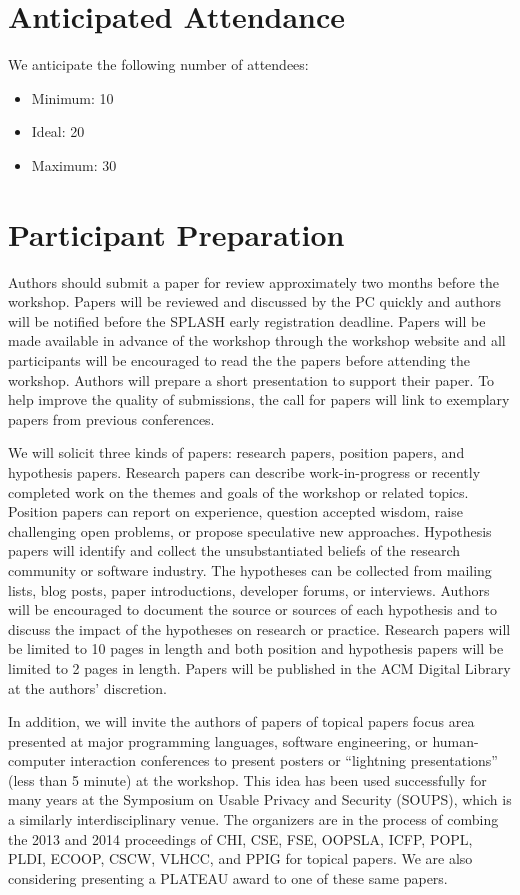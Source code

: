 \documentclass{sigplanconf}
\begin{document}
\section{Anticipated Attendance}

We anticipate the following number of attendees:

\begin{itemize}
\item Minimum: 10 
\item Ideal: 20
\item Maximum: 30 
\end{itemize}

\section{Participant Preparation}\label{preparation}

Authors should submit a paper for review approximately two months before the workshop. Papers will be reviewed and discussed by the PC quickly and authors will be notified before the SPLASH early registration deadline. Papers will be made available in advance of the workshop through the workshop website and all participants will be encouraged to read the the papers before attending the workshop. Authors will prepare a short presentation to support their paper. To help improve the quality of submissions, the call for papers will link to exemplary papers from previous conferences.

We will solicit three kinds of papers: research papers,  position papers, and hypothesis papers. Research papers can  describe work-in-progress or recently completed work on the themes and goals of the workshop or related topics. Position papers can report on experience, question accepted wisdom, raise challenging open problems, or propose speculative new approaches. Hypothesis papers will identify and collect the unsubstantiated beliefs of the research community or software industry. The hypotheses can be collected from mailing lists, blog posts, paper introductions,  developer forums, or interviews. Authors will be encouraged to document the source or sources of each hypothesis and to discuss the impact of the hypotheses on research or practice. Research papers will be limited to 10 pages in length and both position and hypothesis papers will be limited to 2 pages in length. Papers will be published in the ACM Digital Library at the authors' discretion.

In addition, we will invite the authors of papers of topical papers focus area presented at major programming languages, software engineering, or human-computer interaction conferences to present posters or ``lightning presentations'' (less than 5 minute) at the workshop. This idea has been used successfully for many years at the Symposium on Usable Privacy and Security (SOUPS), which is a similarly interdisciplinary venue. The organizers are in the process of combing the 2013 and 2014 proceedings of CHI, CSE, FSE, OOPSLA, ICFP, POPL, PLDI, ECOOP, CSCW, VLHCC, and PPIG for topical papers. We are also considering presenting a PLATEAU award to one of these same papers.
\end{document}
